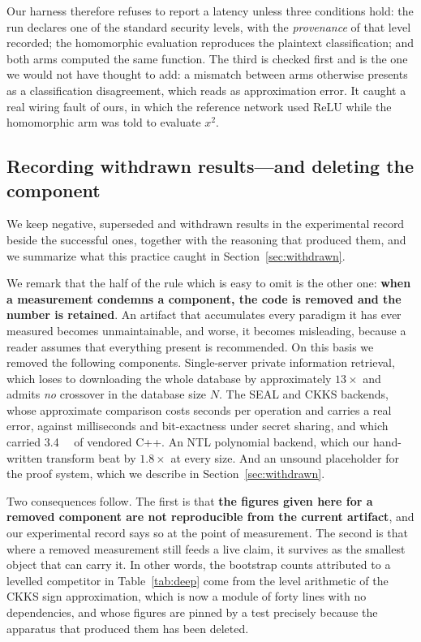 \documentclass[11pt]{article}
\newcommand{\ReLU}{\ensuremath{\mathrm{ReLU}}}
\begin{document}
Our harness therefore refuses to report a latency unless three conditions hold: the
run declares one of the standard security levels, with the \emph{provenance} of that
level recorded; the homomorphic evaluation reproduces the plaintext classification;
and both arms computed the same function. The third is checked first and is the one
we would not have thought to add: a mismatch between arms otherwise presents as a
classification disagreement, which reads as approximation error. It caught a real
wiring fault of ours, in which the reference network used \ReLU{} while the
homomorphic arm was told to evaluate $x^2$.

\subsection{Recording withdrawn results---and deleting the component}
\label{sec:withdrawn-policy}

We keep negative, superseded and withdrawn results in the experimental record beside the
successful ones, together with the reasoning that produced them, and we summarize what this
practice caught in Section~\ref{sec:withdrawn}.

We remark that the half of the rule which is easy to omit is the other one: \textbf{when a
measurement condemns a component, the code is removed and the number is retained}. An artifact
that accumulates every paradigm it has ever measured becomes unmaintainable, and worse, it
becomes misleading, because a reader assumes that everything present is recommended. On this
basis we removed the following components. Single-server private information retrieval, which
loses to downloading the whole database by approximately $13\times$ and admits \emph{no}
crossover in the database size $N$. The SEAL and CKKS backends, whose approximate comparison
costs seconds per operation and carries a real error, against milliseconds and bit-exactness
under secret sharing, and which carried \SI{3.4}{\mega\byte} of vendored C++. An NTL polynomial
backend, which our hand-written transform beat by $1.8\times$ at every size. And an unsound
placeholder for the proof system, which we describe in Section~\ref{sec:withdrawn}.

Two consequences follow. The first is that \textbf{the figures given here for a removed
component are not reproducible from the current artifact}, and our experimental record says so at
the point of measurement. The second is that where a removed measurement still feeds a live claim,
it survives as the smallest object that can carry it. In other words, the bootstrap counts
attributed to a levelled competitor in Table~\ref{tab:deep} come from the level arithmetic of the
CKKS sign approximation, which is now a module of forty lines with no dependencies, and whose
figures are pinned by a test precisely because the apparatus that produced them has been
deleted.
\end{document}
